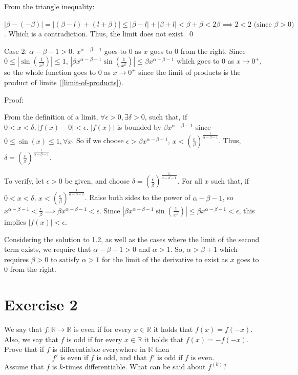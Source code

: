 \documentclass{article}
\begin{document}
From the triangle inequality:

$|\beta-(-\beta)| = |(\beta-l)+(l+\beta)| \le |\beta-l| + |\beta+l| < \beta+\beta < 2\beta \implies 2<2 \text{ (since } \beta>0)$.
Which is a contradiction. Thus, the limit does not exist. \qed

Case 2: $\alpha-\beta-1>0$. $x^{\alpha-\beta-1}$ goes to 0 as $x$ goes to 0 from the right. Since $0 \le |\sin(\frac{1}{x^\beta})| \le 1$,
$|\beta x^{\alpha-\beta-1}\sin(\frac{1}{x^\beta})| \le \beta x^{\alpha-\beta-1}$ which goes to 0 as $x \to 0^+$, so the whole function goes to 0
as $x \to 0^+$ since the limit of products is the product of limits (\cref{limit-of-products}).

Proof:

From the definition of a limit, $\forall \epsilon > 0, \exists \delta > 0$, such that, if $0 < x < \delta, |f(x)-0| < \epsilon$. $|f(x)|$ is bounded
by $\beta x^{\alpha-\beta-1}$ since $0 \le \sin(x) \le 1, \forall x$. So if we choose $\epsilon > \beta x^{\alpha-\beta-1}$,
$x < (\frac{\epsilon}{\beta})^{\frac{1}{\alpha-\beta-1}}$. Thus, $\delta = (\frac{\epsilon}{\beta})^{\frac{1}{\alpha-\beta-1}}$.

To verify, let $\epsilon > 0$ be given, and choose $\delta = (\frac{\epsilon}{\beta})^{\frac{1}{\alpha-\beta-1}}$. For all $x$ such that, if
$0 < x < \delta$, $x < (\frac{\epsilon}{\beta})^{\frac{1}{\alpha-\beta-1}}$. Raise both sides to the power of $\alpha-\beta-1$, so
$x^{\alpha-\beta-1}<\frac{\epsilon}{\beta} \implies \beta x^{\alpha-\beta-1}<\epsilon$.
Since $|\beta x^{\alpha-\beta-1}\sin(\frac{1}{x^\beta})| \le \beta x^{\alpha-\beta-1}<\epsilon$, this implies $|f(x)|<\epsilon$.

Considering the solution to 1.2, as well as the cases where the limit of the second term exists, we require that $\alpha-\beta-1>0$ and $\alpha>1$.
So, $\alpha > \beta + 1$ which requires $\beta > 0$ to satisfy $\alpha>1$ for the limit of the derivative to exist as $x$ goes to 0 from the right.

\section{Exercise 2}
We say that $f : \mathbb{R} \to \mathbb{R}$ is even if for every $x \in \mathbb{R}$ it holds that $f(x)=f(-x)$. Also, we say that $f$ is odd if
for every $x \in \mathbb{R}$ it holds that $f(x)=-f(-x)$. Prove that if $f$ is differentiable everywhere in $\mathbb{R}$ then
\begin{equation*}
	f' \text{ is even if }f \text{ is odd, and that }f'\text{ is odd if }f \text{ is even.}
\end{equation*}
Assume that $f$ is $k$-times differentiable. What can be said about $f^{(k)}$?
\end{document}
